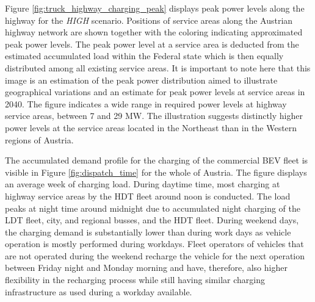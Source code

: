 \documentclass[final,10pt]{elsarticle}
\begin{document}
        Figure \ref{fig:truck_highway_charging_peak} displays peak power levels along the highway for the \textit{HIGH} scenario. Positions of service areas along the Austrian highway network are shown together with the coloring indicating approximated peak power levels. The peak power level at a service area is deducted from the estimated accumulated load within the Federal state which is then equally distributed among all existing service areas. It is important to note here that this image is an estimation of the peak power distribution aimed to illustrate geographical variations and an estimate for peak power levels at service areas in 2040. The figure indicates a wide range in required power levels at highway service areas, between 7 and 29 MW. The illustration suggests distinctly higher power levels at the service areas located in the Northeast than in the Western regions of Austria. 
        
        The accumulated demand profile for the charging of the commercial \ac{BEV} fleet is visible in Figure \ref{fig:dispatch_time} for the whole of Austria. The figure displays an average week of charging load. During daytime time, most charging at highway service areas by the \acl{HDT} fleet around noon is conducted. The load peaks at night time around midnight due to accumulated night charging of the \ac{LDT} fleet, city, and regional busses, and the \ac{HDT} fleet. During weekend days, the charging demand is substantially lower than during work days as vehicle operation is mostly performed during workdays. Fleet operators of vehicles that are not operated during the weekend recharge the vehicle for the next operation between Friday night and Monday morning and have, therefore, also higher flexibility in the recharging process while still having similar charging infrastructure as used during a workday available.  
        


        
\end{document}
